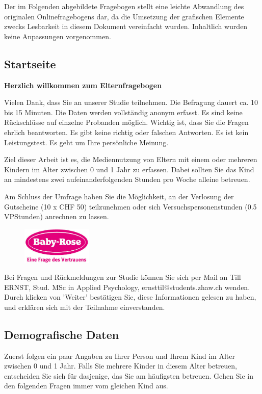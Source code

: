 Der im Folgenden abgebildete Fragebogen stellt eine leichte Abwandlung des originalen Onlinefragebogens dar, da die Umsetzung der grafischen Elemente zwecks Lesbarkeit in diesem Dokument vereinfacht wurden. Inhaltlich wurden keine Anpassungen vorgenommen.

\begin{flushleft}
\subsection{Startseite}
\textbf{Herzlich willkommen zum Elternfragebogen}

\vspace{2mm}
Vielen Dank, dass Sie an unserer Studie teilnehmen. Die Befragung dauert ca. 10 bis 15 Minuten. Die Daten werden vollständig anonym erfasst. Es sind keine Rückschlüsse auf einzelne Probanden möglich. Wichtig ist, dass Sie die Fragen ehrlich beantworten. Es gibt keine richtig oder falschen Antworten. Es ist kein Leistungstest. Es geht um Ihre persönliche Meinung.

\vspace{2mm}
Ziel dieser Arbeit ist es, die Mediennutzung von Eltern mit einem oder mehreren Kindern im Alter zwischen 0 und 1 Jahr zu erfassen. Dabei sollten Sie das Kind an mindestens zwei aufeinanderfolgenden Stunden pro Woche alleine betreuen.

\vspace{2mm}
Am Schluss der Umfrage haben Sie die Möglichkeit, an der Verlosung der Gutscheine (10 x CHF 50) teilzunehmen oder sich Versuchspersonenstunden (0.5 VPStunden) anrechnen zu lassen.

\begin{figure}[hbtp]
  \centering
     \includegraphics[width=0.3\textwidth]{content/Grafik/babyRose_Logo.jpg}
  \label{fig:babyRose_Logo}
\end{figure}

Bei Fragen und Rückmeldungen zur Studie können Sie sich per Mail an Till ERNST, Stud. MSc in Applied Psychology, ernsttil@students.zhaw.ch wenden. Durch klicken von 'Weiter' bestätigen Sie, diese Informationen gelesen zu haben, und erklären sich mit der Teilnahme einverstanden.

\subsection{Demografische Daten}
Zuerst folgen ein paar Angaben zu Ihrer Person und Ihrem Kind im Alter zwischen 0 und 1 Jahr. Falls Sie mehrere Kinder in diesem Alter betreuen, entscheiden Sie sich für dasjenige, das Sie am häufigsten betreuen. Gehen Sie in den folgenden Fragen immer vom gleichen Kind aus.


\end{flushleft}
